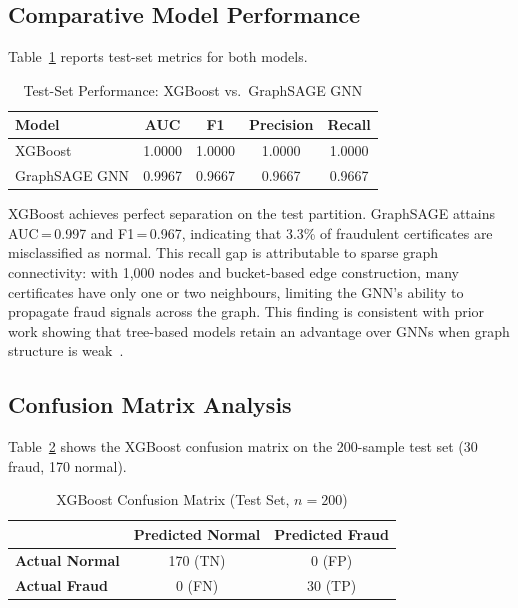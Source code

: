 \documentclass[conference]{IEEEtran}
\begin{document}
\subsection{Comparative Model Performance}

Table~\ref{tab:comparison} reports test-set metrics for both models.

\begin{table}[htbp]
\caption{Test-Set Performance: XGBoost vs.\ GraphSAGE GNN}
\label{tab:comparison}
\begin{center}
\begin{tabular}{lcccc}
\toprule
\textbf{Model} & \textbf{AUC} & \textbf{F1} & \textbf{Precision} & \textbf{Recall} \\
\midrule
XGBoost       & 1.0000 & 1.0000 & 1.0000 & 1.0000 \\
GraphSAGE GNN & 0.9967 & 0.9667 & 0.9667 & 0.9667 \\
\bottomrule
\end{tabular}
\end{center}
\end{table}

XGBoost achieves perfect separation on the test partition. GraphSAGE
attains AUC\,=\,0.997 and F1\,=\,0.967, indicating that 3.3\% of
fraudulent certificates are misclassified as normal. This recall gap
is attributable to sparse graph connectivity: with 1,000 nodes and
bucket-based edge construction, many certificates have only one or
two neighbours, limiting the GNN's ability to propagate fraud
signals across the graph. This finding is consistent with prior
work showing that tree-based models retain an advantage over GNNs
when graph structure is weak~\cite{ref9}.

\subsection{Confusion Matrix Analysis}

Table~\ref{tab:confusion} shows the XGBoost confusion matrix on the
200-sample test set (30 fraud, 170 normal).

\begin{table}[htbp]
\caption{XGBoost Confusion Matrix (Test Set, $n = 200$)}
\label{tab:confusion}
\begin{center}
\begin{tabular}{lcc}
\toprule
 & \textbf{Predicted Normal} & \textbf{Predicted Fraud} \\
\midrule
\textbf{Actual Normal} & 170 (TN) & 0 (FP) \\
\textbf{Actual Fraud}  & 0 (FN)   & 30 (TP) \\
\bottomrule
\end{tabular}
\end{center}
\end{table}
\end{document}
